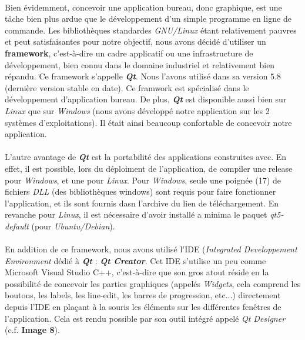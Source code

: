 \documentclass[12pt, a4paper]{report}
\begin{document}
\paragraph{}Bien évidemment, concevoir une application bureau, donc graphique, est une tâche bien plus ardue que le développement d'un simple programme en ligne de commande. Les bibliothèques standardes \textit{GNU/Linux} étant relativement pauvres et peut satisfaisantes pour notre objectif, nous avons décidé d'utiliser un \textbf{framework}, c'est-à-dire un cadre applicatif ou une infrastructure de développement, bien connu dans le domaine industriel et relativement bien répandu. Ce framework s'appelle \textbf{\textit{Qt}}. Nous l'avons utilisé dans sa version 5.8 (dernière version stable en date). Ce framwork est spécialisé dans le développement d'application bureau. De plus, \textbf{\textit{Qt}} est disponible aussi bien sur \textit{Linux} que sur \textit{Windows} (nous avons développé notre application sur les 2 systèmes d'exploitations). Il était ainsi beaucoup confortable de concevoir notre application.

\paragraph{}L'autre avantage de \textbf{\textit{Qt}} est la portabilité des applications construites avec. En effet, il est possible, lors du déploiment de l'application, de compiler une release pour \textit{Windows}, et une pour \textit{Linux}. Pour \textit{Windows}, seule une poignée (17) de fichiers \textit{DLL} (des bibliothèques windows) sont requis pour faire fonctionner l'application, et ils sont fournis dasn l'archive du lien de téléchargement. En revanche pour \textit{Linux}, il est nécessaire d'avoir installé a minima le paquet \textit{qt5-default} (pour \textit{Ubuntu/Debian}).

\paragraph{}En addition de ce framework, nous avons utilisé l'IDE (\textit{Integrated Developpement Environment} dédié à \textbf{\textit{Qt}} : \textbf{\textit{Qt Creator}}. Cet IDE s'utilise un peu comme Microsoft Visual Studio C++, c'est-à-dire que son gros atout réside en la possibilité de concevoir les parties graphiques (appelés \textit{Widgets}, cela comprend les boutons, les labels, les line-edit, les barres de progression, etc...) directement depuis l'IDE en plaçant à la souris les éléments sur les différentes fenêtres de l'application. Cela est rendu possible par son outil intégré appelé \textit{Qt Designer} (c.f. \textbf{Image 8}).
\end{document}
